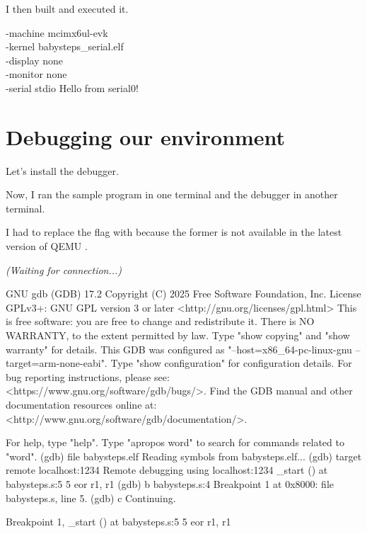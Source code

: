 I then built and executed it.

\begin{terminal}
    -machine mcimx6ul-evk \\
    -kernel babysteps_serial.elf \\
    -display none \\
    -monitor none \\
    -serial stdio
Hello from serial0!
\end{terminal}

\section{Debugging our environment}

Let's install the debugger.

\TermPath{~}
\begin{terminal}
\end{terminal}

Now, I ran the sample program in one terminal and the debugger in another terminal.

I had to replace the flag  with  because the former is not available in the latest version of QEMU .

\begin{terminal}
\textit{(Waiting for connection...)}
\end{terminal}

\begin{terminal}
GNU gdb (GDB) 17.2
Copyright (C) 2025 Free Software Foundation, Inc.
License GPLv3+: GNU GPL version 3 or later <http://gnu.org/licenses/gpl.html>
This is free software: you are free to change and redistribute it.
There is NO WARRANTY, to the extent permitted by law.
Type "show copying" and "show warranty" for details.
This GDB was configured as "--host=x86_64-pc-linux-gnu --target=arm-none-eabi".
Type "show configuration" for configuration details.
For bug reporting instructions, please see:
<https://www.gnu.org/software/gdb/bugs/>.
Find the GDB manual and other documentation resources online at:
    <http://www.gnu.org/software/gdb/documentation/>.

For help, type "help".
Type "apropos word" to search for commands related to "word".
(gdb) file babysteps.elf
Reading symbols from babysteps.elf...
(gdb) target remote localhost:1234
Remote debugging using localhost:1234
_start () at babysteps.s:5
5           eor r1, r1
(gdb) b babysteps.s:4
Breakpoint 1 at 0x8000: file babysteps.s, line 5.
(gdb) c
Continuing.

Breakpoint 1, _start () at babysteps.s:5
5           eor r1, r1
\end{terminal}


